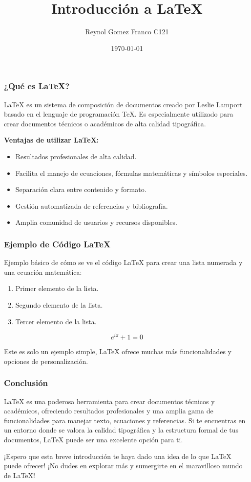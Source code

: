 \documentclass{beamer}
\title{Introducción a LaTeX}
\author{Reynol Gomez Franco C121}
\date{\today}
\begin{document}
	
	\begin{frame}
		\titlepage
	\end{frame}
	
	\begin{frame}
		\frametitle{¿Qué es LaTeX?}
		\LaTeX{} es un sistema de composición de documentos creado por Leslie Lamport basado en el lenguaje de programación TeX. Es especialmente utilizado para crear documentos técnicos o académicos de alta calidad tipográfica.
		
		\textbf{Ventajas de utilizar LaTeX:}
		\begin{itemize}
			\item Resultados profesionales de alta calidad.
			\item Facilita el manejo de ecuaciones, fórmulas matemáticas y símbolos especiales.
			\item Separación clara entre contenido y formato.
			\item Gestión automatizada de referencias y bibliografía.
			\item Amplia comunidad de usuarios y recursos disponibles.
		\end{itemize}
	\end{frame}
	
	\begin{frame}
		\frametitle{Ejemplo de Código LaTeX}
		Ejemplo básico de cómo se ve el código LaTeX para crear una lista numerada y una ecuación matemática:
		
		\begin{enumerate}
			\item Primer elemento de la lista.
			\item Segundo elemento de la lista.
			\item Tercer elemento de la lista.
		\end{enumerate}
		
		\begin{equation}
			e^{i\pi} + 1 = 0
		\end{equation}
		
		Este es solo un ejemplo simple, LaTeX ofrece muchas más funcionalidades y opciones de personalización.
		
	\end{frame}
	
	\begin{frame}
		
	\frametitle{Conclusión}
	LaTeX es una poderosa herramienta para crear documentos técnicos y académicos, ofreciendo resultados profesionales y una amplia gama de funcionalidades para manejar texto, ecuaciones y referencias. Si te encuentras en un entorno donde se valora la calidad tipográfica y la estructura formal de tus documentos, LaTeX puede ser una excelente opción para ti.
	
	¡Espero que esta breve introducción te haya dado una idea de lo que LaTeX puede ofrecer! ¡No dudes en explorar más y sumergirte en el maravilloso mundo de LaTeX!
	
\end{frame}
\end{document}
